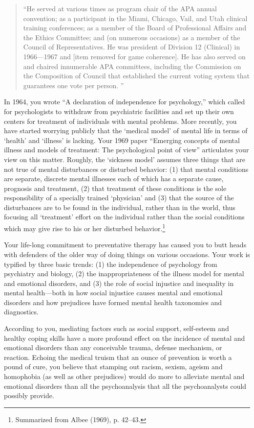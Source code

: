 \begin{refsection}
\begin{quote}

``He served at various times as program chair of the APA annual convention; as a participant in the Miami, Chicago, Vail, and Utah clinical training conferences; as a member of the Board of Professional Affairs and the Ethics Committee; and (on numerous occasions) as a member of the Council of Representatives. He was president of Division 12 (Clinical) in 1966---1967 and [item removed for game coherence]. He has also served on and chaired innumerable APA committees, including the Commission on the Composition of Council that established the current voting system that guarantees one vote per person. ''
\end{quote}

In 1964, you wrote ``A declaration of independence for psychology,'' which called for psychologists to withdraw from psychiatric facilities and set up their own centers for treatment of individuals with mental problems. More recently, you have started worrying publicly that the `medical model' of mental life in terms of `health' and `illness' is lacking. Your 1969 paper ``Emerging concepts of mental illness and models of treatment: The psychological point of view'' articulates your view on this matter. Roughly, the `sickness model' assumes three things that are not true of mental disturbances or disturbed behavior: (1) that mental conditions are separate, discrete mental illnesses each of which has a separate cause, prognosis and treatment, (2) that treatment of these conditions is the sole responsibility of a specially trained `physician' and (3) that the source of the disturbances are to be found in the individual, rather than in the world, thus focusing all `treatment' effort on the individual rather than the social conditions which may give rise to his or her disturbed behavior.\footnote{Summarized from Albee (1969), p. 42--43.}

Your life-long commitment to preventative therapy has caused you to butt heads with defenders of the older way of doing things on various occasions. Your work is typified by three basic trends: (1) the independence of psychology from psychiatry and biology, (2) the inappropriateness of the illness model for mental and emotional disorders, and (3) the role of social injustice and inequality in mental health---both in how social injustice causes mental and emotional disorders and how prejudices have formed mental health taxonomies and diagnostics.

According to you, mediating factors such as social support, self-esteem and healthy coping skills have a more profound effect on the incidence of mental and emotional disorders than any conceivable trauma, defense mechanism, or reaction. Echoing the medical truism that an ounce of prevention is worth a pound of cure, you believe that stamping out racism, sexism, ageism and homophobia (as well as other prejudices) would do more to alleviate mental and emotional disorders than all the psychoanalysis that all the psychoanalysts could possibly provide.


\end{refsection}
